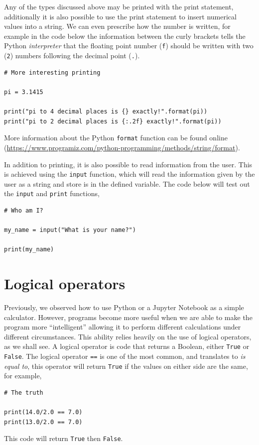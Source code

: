 \documentclass[a4paper]{article}
\begin{document}
Any of the types discussed above may be printed with the print statement, additionally it is also possible to use the print statement to insert numerical values into a string.
We can even prescribe how the number is written, for example in the code below the information between the curly brackets tells the Python \emph{interpreter} that the floating point number (\texttt{f}) should be written with two (\texttt{2}) numbers following the decimal point (\texttt{.}).
\begin{lstlisting}
# More interesting printing

pi = 3.1415

print("pi to 4 decimal places is {} exactly!".format(pi))
print("pi to 2 decimal places is {:.2f} exactly!".format(pi))
\end{lstlisting}
More information about the Python \texttt{format} function can be found online (\url{https://www.programiz.com/python-programming/methods/string/format}).

In addition to printing, it is also possible to read information from the user.
This is achieved using the \texttt{input} function, which will read the information given by the user as a string and store is in the defined variable.
The code below will test out the \texttt{input} and \texttt{print} functions,
\begin{lstlisting}
# Who am I?

my_name = input("What is your name?")

print(my_name)
\end{lstlisting}

\section{Logical operators}

Previously, we observed how to use Python or a Jupyter Notebook as a simple calculator.
However, programs become more useful when we are able to make the program more ``intelligent'' allowing it to perform different calculations under different circumstances.
This ability relies heavily on the use of logical operators, as we shall see.
A logical operator is code that returns a Boolean, either \texttt{True} or \texttt{False}.
The logical operator \texttt{==} is one of the most common, and translates to \emph{is equal to}, this operator will return \texttt{True} if the values on either side are the same, for example,
\begin{lstlisting}
# The truth

print(14.0/2.0 == 7.0)
print(13.0/2.0 == 7.0)
\end{lstlisting}
This code will return \texttt{True} then \texttt{False}.
\end{document}
